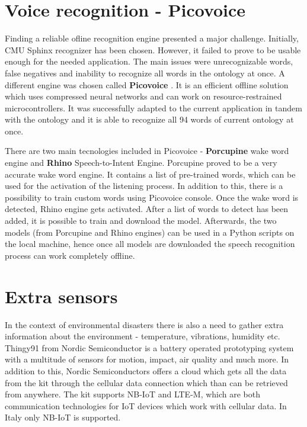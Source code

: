 \documentclass[conference]{IEEEtran}
\begin{document}
\section{Voice recognition - Picovoice}

Finding a reliable ofline recognition engine presented a major challenge. Initially,
CMU Sphinx recognizer \cite{sphinx} has been chosen. However, it failed to prove to be usable enough for the needed application. The main issues were unrecognizable words, false negatives and inability to recognize all words in the ontology at once. A different engine was chosen called \textbf{Picovoice} \cite{pico}. It is an efficient offline solution which uses compressed neural networks and can work on resource-restrained microcontrollers. It was successfully adapted to the current application in tandem with the ontology and it is able to recognize all 94 words of current ontology at once. 

There are two main tecnologies included in Picovoice - \textbf{Porcupine} \cite{porcupine} wake word engine and \textbf{Rhino} \cite{rhino} Speech-to-Intent Engine. Porcupine proved to be a very accurate wake word engine. It contains a list of pre-trained words, which can be used for the activation of the listening process. In addition to this, there is a possibility to train custom words using Picovoice console. Once the wake word is detected, Rhino engine gets activated. After a list of words to detect has been added, it is possible to train and download the model. Afterwards, the two models (from Porcupine and Rhino engines) can be used in a Python scripts on the local machine, hence once all models are downloaded the speech recognition process can work completely offline.

\section{Extra sensors}

In the context of environmental disasters there is also a need to gather extra information about the environment - temperature, vibrations, humidity etc. Thingy91 from Nordic Semiconductor \cite{thingy} is a battery operated prototyping system with a multitude of sensors for motion, impact, air quality and much more. In addition to this, Nordic Semiconductors offers a cloud which gets all the data from the kit through the cellular data connection which than can be retrieved from anywhere. The kit supports NB-IoT and LTE-M, which are both communication technologies for IoT devices which work with cellular data. In Italy only NB-IoT is supported. 
\end{document}
